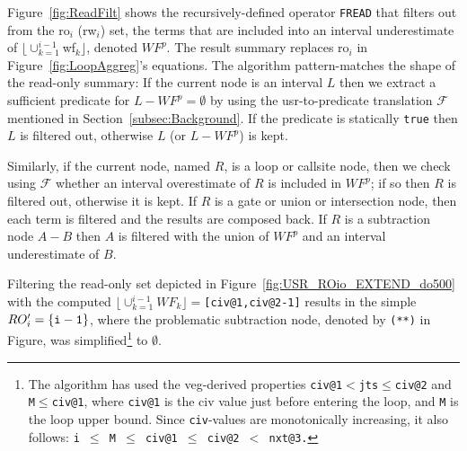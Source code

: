 \documentclass[10pt,nocopyrightspace]{sigplanconf}
\begin{document}
Figure~\ref{fig:ReadFilt} shows the recursively-defined operator {\tt FREAD} that
filters out from the {\sc ro}$_i$ ({\sc rw}$_i$) set, the terms that are included 
into an interval underestimate of $\lfloor\cup_{k=1}^{i-1}${\sc wf}$_k\rfloor$, 
denoted $WF^p$.
The result summary replaces {\sc ro}$_i$ in Figure~\ref{fig:LoopAggreg}'s equations.
%
The algorithm pattern-matches the shape of the read-only summary:
If the current node is an interval $L$ then we extract a %
sufficient predicate for $L - WF^p = \emptyset$ by using the {\sc usr}-to-predicate
translation $\mathcal{F}$ mentioned in Section~\ref{subsec:Background}.   
If the predicate is statically {\tt true}  then $L$ is filtered out, 
otherwise $L$ (or $L-WF^p$) is kept.

Similarly, if the current node, named $R$, is a loop or callsite node, 
then we check using $\mathcal{F}$ whether an interval overestimate of 
$R$ is included in $WF^p$; if so then $R$ is filtered out, otherwise 
it is kept.  
%
If $R$ is a gate or union or intersection node,
then each term is filtered and the results are composed back. 
%
If $R$ is a subtraction node $A-B$ then $A$ is filtered with the union 
of $WF^p$ and an interval underestimate of $B$. 

Filtering the read-only set depicted in Figure~\ref{fig:USR_ROio_EXTEND_do500}
with the computed $\lfloor \cup_{k=1}^{i-1}WF_k\rfloor=${\tt[civ@1,civ@2-1]}
results in the simple $RO'_{i} = {\tt\{i-1\}}$, where the problematic 
subtraction node, denoted by {\tt (**)} in Figure, was simplified\footnote{
The algorithm has used the {\sc veg}-derived properties {\tt civ@1$<$jts$\leq$civ@2} 
and {\tt M$\leq$civ@1}, where {\tt civ@1} is the {\sc civ} value 
just before entering the loop, and {\tt M} is the loop upper bound. Since 
{\tt civ}-values are monotonically increasing, it also follows: 
{\tt i $\leq$ M $\leq$ civ@1 $\leq$ civ@2 $<$ nxt@3.}
}
to $\emptyset$.%


\vspace{1ex}
\end{document}
